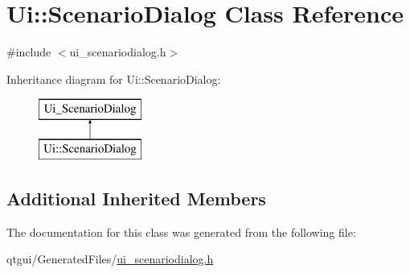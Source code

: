 \hypertarget{class_ui_1_1_scenario_dialog}{}\section{Ui\+::Scenario\+Dialog Class Reference}
\label{class_ui_1_1_scenario_dialog}


{\ttfamily \#include $<$ui\+\_\+scenariodialog.\+h$>$}

Inheritance diagram for Ui\+::Scenario\+Dialog\+:\begin{figure}[H]
\begin{center}
\leavevmode
\includegraphics[height=2.000000cm]{db/d3a/class_ui_1_1_scenario_dialog}
\end{center}
\end{figure}
\subsection*{Additional Inherited Members}


The documentation for this class was generated from the following file\+:\begin{DoxyCompactItemize}
\item 
qtgui/\+Generated\+Files/\mbox{\hyperlink{ui__scenariodialog_8h}{ui\+\_\+scenariodialog.\+h}}\end{DoxyCompactItemize}
